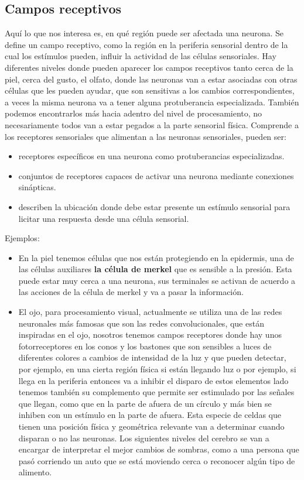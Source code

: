 \subsection{Campos receptivos}
Aquí lo que nos interesa es, en qué región puede ser afectada una neurona. Se define un campo receptivo, como la región en la periferia sensorial
dentro de la cual los estímulos pueden, influir la actividad de las células sensoriales.  Hay diferentes niveles donde pueden aparecer los campos receptivos tanto cerca de la piel, cerca del gusto, el olfato, donde las neuronas van a estar asociadas con otras células que les pueden ayudar, que son sensitivas a los cambios correspondientes, a veces la misma neurona va a tener alguna protuberancia especializada.
También podemos encontrarlos más hacia adentro del nivel de procesamiento, no necesariamente todos van a estar pegados a la parte sensorial física.
Comprende a los receptores sensoriales que alimentan a las neuronas sensoriales, pueden ser:

\begin{itemize}
\item receptores específicos en una neurona como protuberancias especializadas. 
\item conjuntos de receptores capaces de activar una neurona mediante conexiones sinápticas. 
\item describen la ubicación donde debe estar presente un estímulo sensorial para licitar una respuesta desde una célula sensorial. 
\end{itemize}

Ejemplos:

\begin{itemize}
\item En la piel tenemos células que nos están protegiendo en la epidermis, una de las células auxiliares \textbf{la célula de merkel} que es
sensible a la presión. Esta puede estar muy cerca a una neurona, sus terminales se activan de acuerdo a las acciones de la célula de merkel y va a pasar la información.  
\item El ojo, para procesamiento visual, actualmente se utiliza una de las redes neuronales más famosas que son las redes convolucionales, que están inspiradas en el ojo, nosotros tenemos campos receptores donde hay unos fotorreceptores en los conos y los bastones que son sensibles a luces de diferentes colores a cambios de intensidad de la luz y que pueden detectar, por ejemplo, en una cierta región física si están llegando luz  o por ejemplo, si llega en la periferia entonces va a inhibir el disparo de estos elementos lado tenemos también su complemento que permite ser estimulado por las señales que llegan, como que en la parte de afuera de un círculo y más bien se inhiben con un estímulo en la parte de afuera. Esta especie de celdas que tienen una posición física y geométrica relevante van a determinar cuando disparan o no las neuronas. Los siguientes niveles del cerebro se van a encargar de interpretar el mejor cambios de sombras, como a una persona que pasó corriendo un auto que se está moviendo cerca o reconocer algún tipo de alimento.
\end{itemize}


